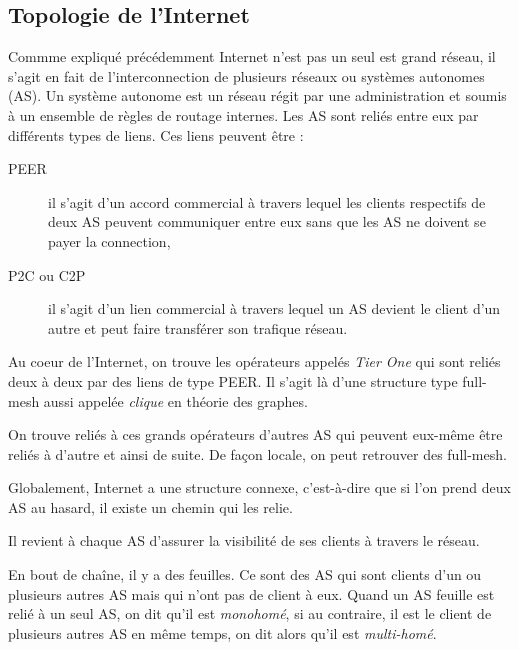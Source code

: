 

%

\subsection{Topologie de l'Internet}
\par
Commme expliqu\'e pr\'ec\'edemment Internet n'est pas un seul est grand r\'eseau, il s'agit en fait de l'interconnection de plusieurs r\'eseaux ou syst\`emes autonomes (AS). Un syst\`eme autonome est un r\'eseau r\'egit par une administration et soumis \`a un ensemble de r\`egles de routage internes. Les AS sont reli\'es entre eux par diff\'erents types de liens. Ces liens peuvent \^etre :
\begin{description}
 \item[PEER] il s'agit d'un accord commercial \`a travers lequel les clients respectifs de deux AS peuvent communiquer entre eux sans que les AS ne doivent se payer la connection,
 \item[P2C ou C2P] il s'agit d'un lien commercial \`a travers lequel un AS devient le client d'un autre et peut faire transf\'erer son trafique r\'eseau.
\end{description}
\par
Au coeur de l'Internet, on trouve les op\'erateurs appel\'es \textit{Tier One} qui sont reli\'es deux \`a deux par des liens de type PEER. Il s'agit l\`a d'une structure type full-mesh aussi appel\'ee \textit{clique} en th\'eorie des graphes.
\par
On trouve reli\'es \`a ces grands op\'erateurs d'autres AS qui peuvent eux-m\^eme \^etre reli\'es \`a d'autre et ainsi de suite. De fa\c con locale, on peut retrouver des full-mesh.
\par
Globalement, Internet a une structure connexe, c'est-\`a-dire que si l'on prend deux AS au hasard, il existe un chemin qui les relie.
\par
Il revient \`a chaque AS d'assurer la visibilit\'e de ses clients \`a travers le r\'eseau.
\par
En bout de cha\^ine, il y a des feuilles. Ce sont des AS qui sont clients d'un ou plusieurs autres AS mais qui n'ont pas de client \`a eux. Quand un AS feuille est reli\'e \`a un seul AS, on dit qu'il est \textit{monohom\'e}, si au contraire, il est le client de plusieurs autres AS en m\^eme temps, on dit alors qu'il est \textit{multi-hom\'e}.


